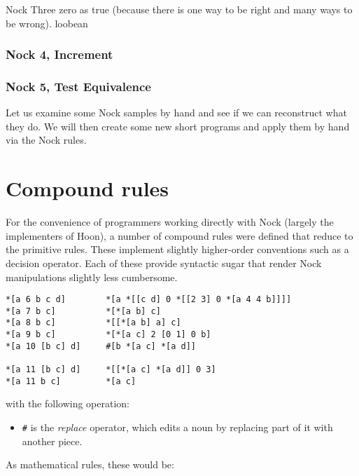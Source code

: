 Nock Three
zero as true (because there is one way to be right and many ways to be wrong).
loobean

\subsubsection[Nock 4]{Nock 4, Increment}
\subsubsection[Nock 5]{Nock 5, Test Equivalence}

Let us examine some Nock samples by hand and see if we can reconstruct what they do.  We will then create some new short programs and apply them by hand via the Nock rules.


\section{Compound rules}

For the convenience of programmers working directly with Nock (largely the implementers of Hoon), a number of compound rules were defined that reduce to the primitive rules.  These implement slightly higher-order conventions such as a decision operator.  Each of these provide syntactic sugar that render Nock manipulations slightly less cumbersome.

\begin{lstlisting}[style=nonumbers]
*[a 6 b c d]        *[a *[[c d] 0 *[[2 3] 0 *[a 4 4 b]]]]
*[a 7 b c]          *[*[a b] c]
*[a 8 b c]          *[[*[a b] a] c]
*[a 9 b c]          *[*[a c] 2 [0 1] 0 b]
*[a 10 [b c] d]     #[b *[a c] *[a d]]

*[a 11 [b c] d]     *[[*[a c] *[a d]] 0 3]
*[a 11 b c]         *[a c]
\end{lstlisting}

with the following operation:

\begin{itemize}
  \item  \texttt{\#} is the \emph{replace} operator, which edits a noun by replacing part of it with another piece.
\end{itemize}

As mathematical rules, these would be:

